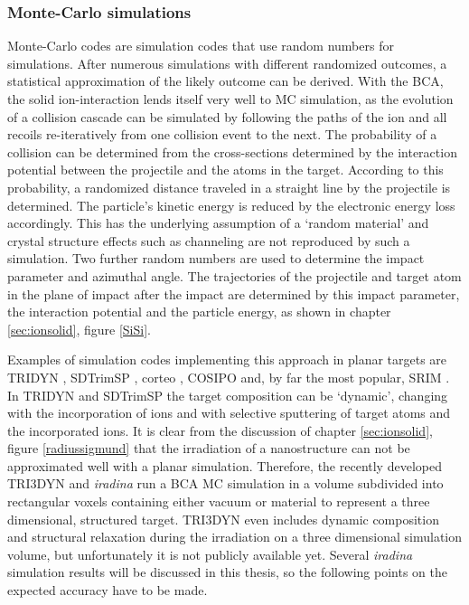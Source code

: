 \subsubsection{Monte-Carlo simulations}

Monte-Carlo codes are simulation codes that use random numbers for simulations. After numerous simulations with different randomized outcomes, a statistical approximation of the likely outcome can be derived. With the BCA, the solid ion-interaction lends itself very well to MC simulation, as the evolution of a collision cascade can be simulated by following the paths of the ion and all recoils re-iteratively from one collision event to the next. The probability of a collision can be determined from the cross-sections determined by the interaction potential between the projectile and the atoms in the target. According to this probability, a randomized distance traveled in a straight line by the projectile is determined. The particle's kinetic energy is reduced by the electronic energy loss accordingly. This has the underlying assumption of a `random material' and crystal structure effects such as channeling are not reproduced by such a simulation. Two further random numbers are used to determine the impact parameter and azimuthal angle. The trajectories of the projectile and target atom in the plane of impact after the impact are determined by this impact parameter, the interaction potential and the particle energy, as shown in chapter \ref{sec:ionsolid}, figure \ref{SiSi}.

Examples of simulation codes implementing this approach in planar targets are TRIDYN \cite{moller_tridyn_1984}, SDTrimSP \cite{bizyukov_morphology_2008}, corteo \cite{schiettekatte_fast_2008}, COSIPO \cite{hautala_nuclear_1984} and, by far the most popular, SRIM \cite{ziegler_srim_2012}. In TRIDYN and SDTrimSP the target composition can be `dynamic', changing with the incorporation of ions and with selective sputtering of target atoms and the incorporated ions. It is clear from the discussion of chapter \ref{sec:ionsolid}, figure \ref{radiussigmund} that the irradiation of a nanostructure can not be approximated well with a planar simulation. Therefore, the recently developed TRI3DYN \cite{moller_tri3dyn_2014} and \emph{iradina} \cite{borschel_ion_2011} run a BCA MC simulation in a volume subdivided into rectangular voxels containing either vacuum or material to represent a three dimensional, structured target. TRI3DYN even includes dynamic composition and structural relaxation during the irradiation on a three dimensional simulation volume, but unfortunately it is not publicly available yet. Several \emph{iradina} simulation results will be discussed in this thesis, so the following points on the expected accuracy have to be made. 

